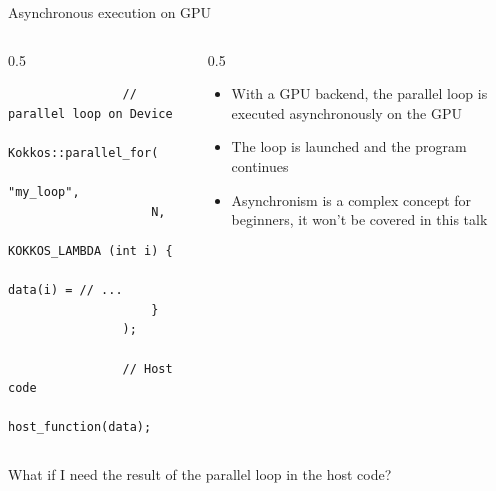 \documentclass[
    aspectratio=169,
    \createHandout
]{beamer}
\begin{document}

\begin{frame}[fragile]{Asynchronous execution on GPU}
    \begin{columns}
        \begin{column}{0.5\linewidth}
            \begin{verbatim}
                // parallel loop on Device
                Kokkos::parallel_for(
                    "my_loop",
                    N,
                    KOKKOS_LAMBDA (int i) {
                        data(i) = // ...
                    }
                );

                // Host code
                host_function(data);
            \end{verbatim}
        \end{column}
        \begin{column}{0.5\linewidth}
            \begin{itemize}
                \item With a GPU backend, the parallel loop is executed asynchronously on the GPU
                \item The loop is launched and the program continues
                \item Asynchronism is a complex concept for beginners, it won't be covered in this talk
            \end{itemize}
        \end{column}
    \end{columns}

    \pause

    \vspace{1em}
     What if I need the result of the parallel loop in the host code?
\end{frame}

\end{document}
